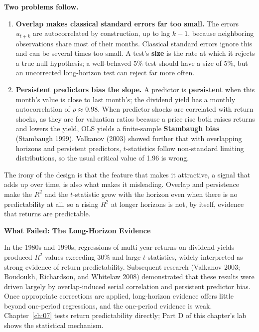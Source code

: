 \textbf{Two problems follow.}
\begin{enumerate}
  \item \textbf{Overlap makes classical standard errors far too small.} The errors $u_{t+k}$ are autocorrelated by construction, up to lag $k-1$, because neighboring observations share most of their months. Classical standard errors ignore this and can be several times too small. A test's \textbf{size} is the rate at which it rejects a true null hypothesis; a well-behaved 5\% test should have a size of 5\%, but an uncorrected long-horizon test can reject far more often.
  \item \textbf{Persistent predictors bias the slope.} A predictor is \textbf{persistent} when this month's value is close to last month's; the dividend yield has a monthly autocorrelation of $\rho \approx 0.98$. When predictor shocks are correlated with return shocks, as they are for valuation ratios because a price rise both raises returns and lowers the yield, OLS yields a finite-sample \textbf{Stambaugh bias} (Stambaugh 1999). Valkanov (2003) showed further that with overlapping horizons and persistent predictors, $t$-statistics follow non-standard limiting distributions, so the usual critical value of 1.96 is wrong.
\end{enumerate}

The irony of the design is that the feature that makes it attractive, a signal that adds up over time, is also what makes it misleading. Overlap and persistence make the $R^2$ and the $t$-statistic grow with the horizon even when there is no predictability at all, so a rising $R^2$ at longer horizons is not, by itself, evidence that returns are predictable.

\begin{callout}
\noindent \textbf{What Failed: The Long-Horizon Evidence}

In the 1980s and 1990s, regressions of multi-year returns on dividend yields produced $R^2$ values exceeding 30\% and large $t$-statistics, widely interpreted as strong evidence of return predictability. Subsequent research (Valkanov 2003; Boudoukh, Richardson, and Whitelaw 2008) demonstrated that these results were driven largely by overlap-induced serial correlation and persistent predictor bias. Once appropriate corrections are applied, long-horizon evidence offers little beyond one-period regressions, and the one-period evidence is weak. Chapter~\ref{ch:07} tests return predictability directly; Part D of this chapter's lab shows the statistical mechanism.
\end{callout}

